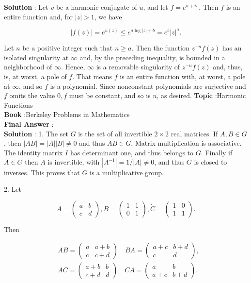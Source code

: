 \documentclass[10pt]{article}
\begin{document}
\textbf{Solution} : Let $v$ be a harmonic conjugate of $u$, and let $f=e^{u+i v}$. Then $f$ is an entire function and, for $|z|>1$, we have

$$
|f(z)|=e^{u(z)} \leqslant e^{a \log |z|+b}=e^{b}|z|^{a} .
$$

Let $n$ be a positive integer such that $n \geqslant a$. Then the function $z^{-n} f(z)$ has an isolated singularity at $\infty$ and, by the preceding inequality, is bounded in a neighborhood of $\infty$. Hence, $\infty$ is a removable singularity of $z^{-n} f(z)$ and, thus, is, at worst, a pole of $f$. That means $f$ is an entire function with, at worst, a pole at $\infty$, and so $f$ is a polynomial. Since nonconstant polynomials are surjective and $f$ omits the value $0, f$ must be constant, and so is $u$, as desired.
\textbf{Topic} :Harmonic Functions \\
\textbf{Book} :Berkeley Problems in Mathematics\\
\textbf{Final Answer} :\\


\textbf{Solution} : 1. The set $G$ is the set of all invertible $2 \times 2$ real matrices. If $A, B \in G$, then $|A B|=|A||B| \neq 0$ and thus $A B \in G$. Matrix multiplication is associative. The identity matrix $I$ has determinant one, and thus belongs to $G$. Finally if $A \in G$ then $A$ is invertible, with $\left|A^{-1}\right|=1 /|A| \neq 0$, and thus $G$ is closed to inverses. This proves that $G$ is a multiplicative group.

2. Let

$$
A=\left(\begin{array}{ll}
a & b \\
c & d
\end{array}\right), B=\left(\begin{array}{ll}
1 & 1 \\
0 & 1
\end{array}\right), \dot{C}=\left(\begin{array}{ll}
1 & 0 \\
1 & 1
\end{array}\right) .
$$

Then

$$
\begin{aligned}
& A B=\left(\begin{array}{ll}a & a+b \\c & c+d\end{array}\right) \quad B A=\left(\begin{array}{cc}a+c & b+d \\c & d\end{array}\right), \\
& A C=\left(\begin{array}{ll}a+b & b \\c+d & d\end{array}\right) \quad C A=\left(\begin{array}{cc}a & b \\a+c & b+d\end{array}\right) .
\end{aligned}
$$
\end{document}
